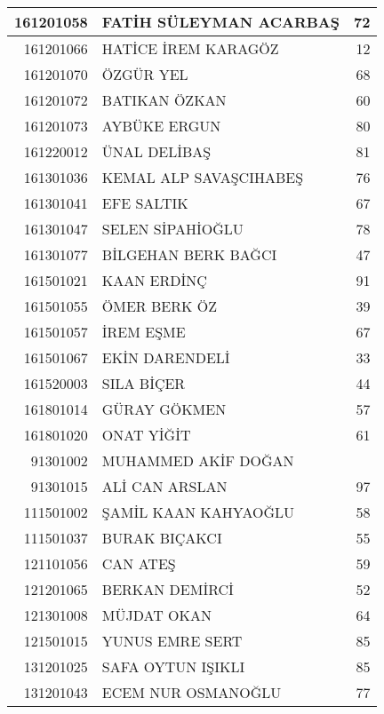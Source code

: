 \documentclass[12pt]{article}
\begin{document}
\begin{longtable}{||r||l||r||}
    \midrule
    161201058 & FATİH SÜLEYMAN ACARBAŞ & 72 \\
    \midrule
    161201066 & HATİCE İREM KARAGÖZ & 12 \\
    \midrule
    161201070 & ÖZGÜR YEL & 68 \\
    \midrule
    161201072 & BATIKAN ÖZKAN & \cellcolor[rgb]{ 1,  1,  0} 60 \\
    \midrule
    161201073 & AYBÜKE ERGUN & \cellcolor[rgb]{ 1,  1,  0} 80 \\
    \midrule
    161220012 & ÜNAL DELİBAŞ & 81 \\
    \midrule
    161301036 & KEMAL ALP SAVAŞCIHABEŞ & 76 \\
    \midrule
    161301041 & EFE SALTIK & 67 \\
    \midrule
    161301047 & SELEN SİPAHİOĞLU & \cellcolor[rgb]{ 1,  1,  0} 78 \\
    \midrule
    161301077 & BİLGEHAN BERK BAĞCI & \cellcolor[rgb]{ 1,  1,  0} 47 \\
    \midrule
    161501021 & KAAN ERDİNÇ & 91 \\
    \midrule
    161501055 & ÖMER BERK ÖZ & 39 \\
    \midrule
    161501057 & İREM EŞME & 67 \\
    \midrule
    161501067 & EKİN DARENDELİ & 33 \\
    \midrule
    161520003 & SILA BİÇER & \cellcolor[rgb]{ 1,  1,  0} 44 \\
    \midrule
    161801014 & GÜRAY GÖKMEN & 57 \\
    \midrule
    161801020 & ONAT YİĞİT & 61 \\
    \midrule
    91301002 & MUHAMMED AKİF DOĞAN &  \\
    \midrule
    91301015 & ALİ CAN ARSLAN & 97 \\
    \midrule
    111501002 & ŞAMİL KAAN KAHYAOĞLU & 58 \\
    \midrule
    111501037 & BURAK BIÇAKCI & 55 \\
    \midrule
    121101056 & CAN ATEŞ & 59 \\
    \midrule
    121201065 & BERKAN DEMİRCİ & 52 \\
    \midrule
    121301008 & MÜJDAT OKAN & 64 \\
    \midrule
    121501015 & YUNUS EMRE SERT & 85 \\
    \midrule
    131201025 & SAFA OYTUN IŞIKLI & \cellcolor[rgb]{ 1,  1,  0} 85 \\
    \midrule
    131201043 & ECEM NUR OSMANOĞLU & \cellcolor[rgb]{ 1,  1,  0} 77 \\

\end{longtable}
\end{document}
